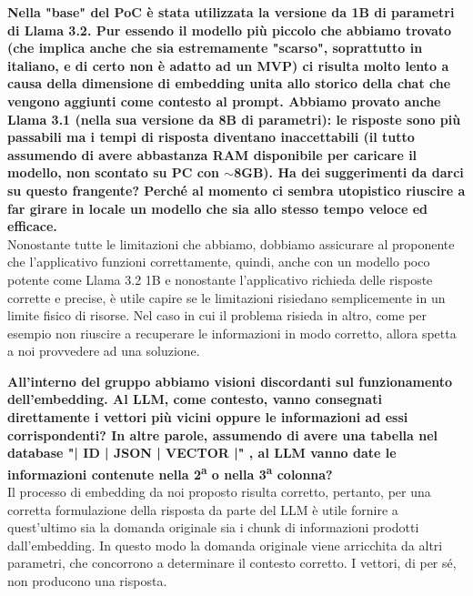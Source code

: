 \begin{itemize}
      \textbf{Nella "base" del PoC è stata utilizzata la versione da 1B di parametri di Llama 3.2. Pur essendo il modello più piccolo che abbiamo trovato (che implica anche che sia estremamente "scarso", soprattutto in italiano, e di certo non è adatto ad un MVP) ci risulta molto lento a causa della dimensione di embedding unita allo storico della chat che vengono aggiunti come contesto al prompt. Abbiamo provato anche Llama 3.1 (nella sua versione da 8B di parametri): le risposte sono più passabili ma i tempi di risposta diventano inaccettabili (il tutto assumendo di avere abbastanza RAM disponibile per caricare il modello, non scontato su PC con $\sim$8GB). Ha dei suggerimenti da darci su questo frangente? Perché al momento ci sembra utopistico riuscire a far girare in locale un modello che sia allo stesso tempo veloce ed efficace.}\\
      Nonostante tutte le limitazioni che abbiamo, dobbiamo assicurare al proponente che l'applicativo funzioni correttamente, quindi, anche con un modello poco potente come Llama 3.2 1B e nonostante l'applicativo richieda delle risposte corrette e precise, è utile capire se le limitazioni risiedano semplicemente in un limite fisico di risorse. Nel caso in cui il problema risieda in altro, come per esempio non riuscire a recuperare le informazioni in modo corretto, allora spetta a noi provvedere ad una soluzione.\\

      \newpage
      
      \textbf{All'interno del gruppo abbiamo visioni discordanti sul funzionamento dell'embedding. Al LLM, come contesto, vanno consegnati direttamente i vettori più vicini oppure le informazioni ad essi corrispondenti? In altre parole, assumendo di avere una tabella nel database "| ID | JSON | VECTOR |" , al LLM vanno date le informazioni contenute nella 2\textsuperscript{a} o nella 3\textsuperscript{a} colonna?}\\
      Il processo di embedding da noi proposto risulta corretto, pertanto, per una corretta formulazione della risposta da parte del LLM è utile fornire a quest'ultimo sia la domanda originale sia i chunk di informazioni prodotti dall'embedding. In questo modo la domanda originale viene arricchita da altri parametri, che concorrono a determinare il contesto corretto. I vettori, di per sé, non producono una risposta.\\

\end{itemize}